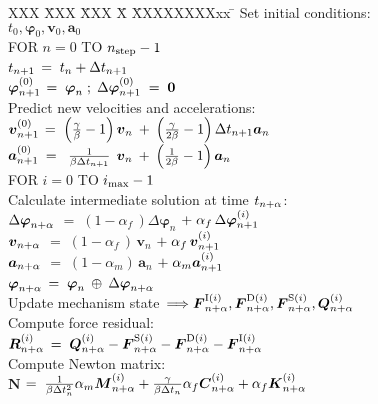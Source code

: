 \begin{figure}[t] \small
\begin{tabbing} XXX \= XXX \= XXX \= X \= XXXXXXXXxx \= \kill
Set initial conditions: $t_0, \bm{\varphi}_0, \bm{v}_0, \bm{a}_0$ \\[2mm]
FOR $n = 0$ TO $n_{\rm step}-1$ \+\\[2mm]
$t_\np1$ \> $=\; t_n + \Delta t_\np1$ \\
$\bm{\varphi}_\np1^{(0)}$ \> $=\; \bm{\varphi}_n\;;\;
\Delta\bm{\varphi}_\np1^{(0)} \;=\; {\bf 0}$ \\[2mm]

Predict new velocities and accelerations: \\
$\bm{v}_\np1^{(0)}$ \> $=\;  \left(\frac{\gamma}{\beta}-1\right)\bm{v}_n \:+\:
                             \left(\frac{\gamma}{2\beta}-1\right)\Delta t_\np1 \bm{a}_n$ \\[1mm]
$\bm{a}_\np1^{(0)}$ \> $=\;\;\frac{1}{\beta\Delta t_\np1}\;\,\bm{v}_n \:+\:
                             \left(\frac{1}{2\beta}-1\right) \bm{a}_n$ \\[2mm]

FOR $i = 0$ TO $i_{\rm max}-1$ \+\\[2mm]
Calculate intermediate solution at time $t_{n+\alpha}$: \\
$\Delta\mbox{\boldmath $\varphi$}_{n+\alpha}$ \>\>$=\; (1-\alpha_f\,)\Delta\bm{\varphi}_n$ \> $+\; \alpha_f\,\Delta\bm{\varphi}_\np1^{(i)}$ \\
$\mbox{\boldmath $v$}_{n+\alpha}$ \>\>$=\; (1-\alpha_f\,)\,\bm{v}_n$ \> $+\; \alpha_f\,\bm{v}_\np1^{(i)}$ \\
$\mbox{\boldmath $a$}_{n+\alpha}$ \>\>$=\; (1-\alpha_m)\,\bm{a}_n$ \> $+\; \alpha_m\bm{a}_\np1^{(i)}$ \\[1mm]
$\mbox{\boldmath $\varphi$}_{n+\alpha}$ \>\>$=\; \mbox{\boldmath $\varphi$}_n \:\oplus\: \Delta\mbox{\boldmath $\varphi$}_{n+\alpha}$ \\[2mm]

Update mechanism state~$\Longrightarrow \mbox{\boldmath $F$}_{n+\alpha}^{{\rm I}(i)}, \mbox{\boldmath $F$}_{n+\alpha}^{{\rm D}(i)},
                                        \mbox{\boldmath $F$}_{n+\alpha}^{{\rm S}(i)}, \mbox{\boldmath $Q$}_{n+\alpha}^{(i)}$ \\[2mm]

Compute force residual: \\
$\mbox{\boldmath $R$}_{n+\alpha}^{(i)}$ \>\> $=\; \mbox{\boldmath $Q$}_{n+\alpha}^{(i)} - \mbox{\boldmath $F$}_{n+\alpha}^{{\rm S}(i)} - \mbox{\boldmath $F$}_{n+\alpha}^{{\rm D}(i)} - \mbox{\boldmath $F$}_{n+\alpha}^{{\rm I}(i)}$ \\[2mm]

Compute Newton matrix:\\
$\bm{N}$ \>\> $=\; \frac{1}{\beta\Delta t_n^2} \alpha_m \mbox{\boldmath $M$}_{n+\alpha}^{(i)}
          + \frac{\gamma}{\beta\Delta t_n} \alpha_f \mbox{\boldmath $C$}_{n+\alpha}^{(i)}
          + \alpha_f \mbox{\boldmath $K$}_{n+\alpha}^{(i)}$ \\[2mm]


\end{tabbing}
\end{figure}
